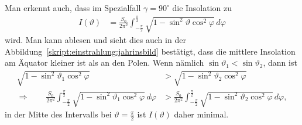 Man erkennt auch, dass im Spezialfall $\gamma=90^\circ$ die Insolation zu
\begin{align*}
I(\vartheta)
&=
\frac{S_0}{2\pi^2}
\int_{-\frac{\pi}2}^{\frac{\pi}2}
\sqrt{1- \sin^2\vartheta\cos^2\varphi}
\,d\varphi
\end{align*}
wird.
Man kann ablesen und sieht dies auch in der 
Abbildung~\ref{skript:einstrahlung:jahrinsbild} bestätigt, dass
die mittlere Insolation am Äquator kleiner ist als an den Polen.
Wenn nämlich $\sin\vartheta_1 < \sin\vartheta_2$, dann ist
\begin{align*}
\sqrt{1- \sin^2\vartheta_1\cos^2\varphi}
&>
\sqrt{1- \sin^2\vartheta_2\cos^2\varphi}
\\
\Rightarrow
\qquad
\frac{S_0}{2\pi^2}
\int_{-\frac{\pi}2}^{\frac{\pi}2}
\sqrt{1- \sin^2\vartheta_1\cos^2\varphi}
\,d\varphi
&>
\frac{S_0}{2\pi^2}
\int_{-\frac{\pi}2}^{\frac{\pi}2}
\sqrt{1- \sin^2\vartheta_2\cos^2\varphi}
\,d\varphi,
\end{align*}
in der Mitte des Intervalls bei $\vartheta=\frac{\pi}2$ ist $I(\vartheta)$
daher minimal.

